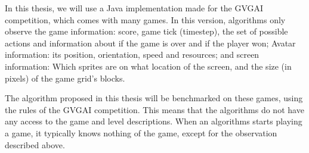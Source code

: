 In this thesis, we will use a Java implementation made for the GVGAI
competition, which comes with many games. In this version, algorithms only
observe the game information: score, game tick (timestep), the set of possible
actions and information about if the game is over and if the player won; Avatar
information: its position, orientation, speed and resources; and screen
information: Which sprites are on what location of the screen, and the size (in
pixels) of the game grid's blocks.

The algorithm proposed in this thesis will be
benchmarked on these games, using the rules of the GVGAI competition. 
This means that the algorithms do not have any access to the game and level
descriptions. When an algorithms starts playing a game, it typically knows
nothing of the game, except for the observation described above.
